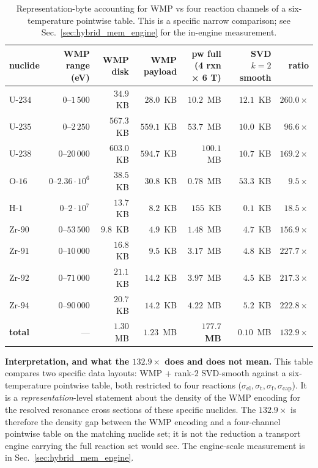 \documentclass[11pt,a4paper]{article}
\begin{document}
\begin{table}[htb]
\centering
\caption{Representation-byte accounting for WMP vs four
reaction channels of a six-temperature pointwise table. This
is a specific narrow comparison; see
Sec.~\ref{sec:hybrid_mem_engine} for the in-engine measurement.}
\label{tab:hybrid_mem}
\begin{tabular}{@{}lrrrrrr@{}}
\toprule
nuclide & WMP range (eV) & WMP disk & WMP payload & pw full (4 rxn × 6 T) & SVD $k{=}2$ smooth & ratio \\
\midrule
U-$234$  & $0$--$1\,500$         & $34.9$~KB  & $28.0$~KB   & $10.2$~MB  & $12.1$~KB  & $260.0\times$ \\
U-$235$  & $0$--$2\,250$         & $567.3$~KB & $559.1$~KB  & $53.7$~MB  & $10.0$~KB  & $96.6\times$ \\
U-$238$  & $0$--$20\,000$        & $603.0$~KB & $594.7$~KB  & $100.1$~MB & $10.7$~KB  & $169.2\times$ \\
O-$16$   & $0$--$2.36\cdot 10^6$ & $38.5$~KB  & $30.8$~KB   & $0.78$~MB  & $53.3$~KB  & $9.5\times$ \\
H-$1$    & $0$--$2\cdot 10^7$    & $13.7$~KB  & $8.2$~KB    & $155$~KB   & $0.1$~KB   & $18.5\times$ \\
Zr-$90$  & $0$--$53\,500$        & $9.8$~KB   & $4.9$~KB    & $1.48$~MB  & $4.7$~KB   & $156.9\times$ \\
Zr-$91$  & $0$--$10\,000$        & $16.8$~KB  & $9.5$~KB    & $3.17$~MB  & $4.8$~KB   & $227.7\times$ \\
Zr-$92$  & $0$--$71\,000$        & $21.1$~KB  & $14.2$~KB   & $3.97$~MB  & $4.5$~KB   & $217.3\times$ \\
Zr-$94$  & $0$--$90\,000$        & $20.7$~KB  & $14.2$~KB   & $4.22$~MB  & $5.2$~KB   & $222.8\times$ \\
\midrule
\textbf{total} & --- & $1.30$~MB & $1.23$~MB & $\mathbf{177.7}$~\textbf{MB} & $0.10$~MB & $\mathbf{132.9\times}$ \\
\bottomrule
\end{tabular}
\end{table}

\textbf{Interpretation, and what the $132.9\times$ does and
does not mean.} This table compares two specific data layouts:
WMP + rank-$2$ SVD-smooth against a six-temperature pointwise
table, both restricted to four reactions
($\sigma_\text{el}, \sigma_\text{t}, \sigma_\text{f},
\sigma_\text{cap}$). It is a \emph{representation}-level
statement about the density of the WMP encoding for the
resolved resonance cross sections of these specific nuclides.
The $132.9\times$ is therefore the density gap between the
WMP encoding and a four-channel pointwise table on the
matching nuclide set; it is not the reduction a transport
engine carrying the full reaction set would see. The
engine-scale measurement is in
Sec.~\ref{sec:hybrid_mem_engine}.
\end{document}
